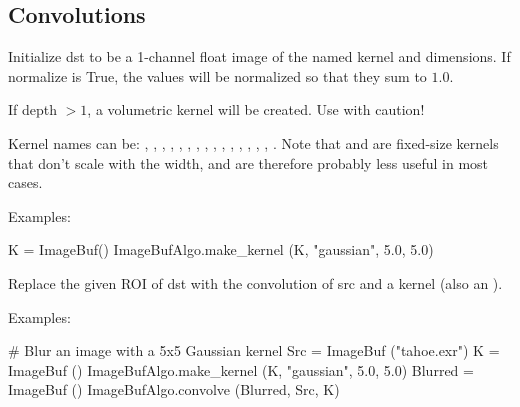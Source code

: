 \begin{comment}
\apiitem{bool {\ce histogram} (src, int channel, \\
  \bigspc std::vector<imagesize_t> \&histogram, int bins=256, \\
  \bigspc float min=0, float max=1, imagesize_t *submin=NULL, \\
  \bigspc imagesize_t *supermax=NULL, roi=ROI.All)}
\index{ImageBufAlgo!histogram} \indexapi{histogram}
\apiend
\end{comment}



\subsection{Convolutions}
\label{sec:iba:py:convolutions}

 
Initialize {\cf dst} to be a 1-channel {\cf float} image of the named kernel
and dimensions.  If {\cf normalize} is {\cf True}, the values will be
normalized so that they sum to $1.0$.

If {\cf depth} $> 1$, a volumetric kernel will be created.  Use with
caution!

Kernel names can be: , , ,
, , , ,
, , , , ,
, , , . Note that
 and  are fixed-size kernels that don't
scale with the width, and are therefore probably less useful in most
cases.

\smallskip
\noindent Examples:
\begin{code}
    K = ImageBuf()
    ImageBufAlgo.make_kernel (K, "gaussian", 5.0, 5.0)
\end{code}
\apiend


 
Replace the given ROI of {\cf dst} with the convolution of {\cf src} and
a kernel (also an \ImageBuf).

\smallskip
\noindent Examples:
\begin{code}
    # Blur an image with a 5x5 Gaussian kernel
    Src = ImageBuf ("tahoe.exr")
    K = ImageBuf ()
    ImageBufAlgo.make_kernel (K, "gaussian", 5.0, 5.0)
    Blurred = ImageBuf ()
    ImageBufAlgo.convolve (Blurred, Src, K)
\end{code}
\apiend


